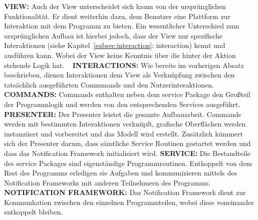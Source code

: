 \newline
\textbf{VIEW:}\newline
Auch der View unterscheidet sich kaum von der ursprünglichen Funktionalität. Er dient weiterhin dazu, dem Benutzer eine Plattform zur Interaktion mit dem Programm zu bieten. Ein wesentlicher Unterschied zum ursprünglichen Aufbau ist hierbei jedoch, dass der View nur spezifische Interaktionen (siehe Kapitel~\ref{subsec:interaction}: interaction) kennt und ausführen kann. Wobei der View keine Kenntnis über die hinter der Aktion stehende Logik hat.
~\newline
\textbf{INTERACTIONS:}\newline
Wie bereits im vorherigen Absatz beschrieben, dienen Interaktionen dem View als Verknüpfung zwischen den tatsächlich ausgeführten Commmands und den Nutzerinteraktionen.\newline
 \newline
\textbf{COMMANDS:}\newline
Commands enthalten neben dem service Package den Großteil der Programmlogik und werden von den entsprechenden Services ausgeführt.\newline
 \newline
\textbf{PRESENTER:}\newline
Der Presenter leistet die gesamte Aufbauarbeit. Commands werden mit bestimmten Interaktionen verknüpft, grafische Oberflächen werden instanziiert und vorbereitet und das Modell wird erstellt.
Zusätzlich kümmert sich der Presenter darum, dass sämtliche Service Routinen gestartet werden und dass das Notification Framework initialisiert wird.\newline
 \newline
\textbf{SERVICE:}\newline
Die Bestandteile des service Packages sind eigenständige Programmroutinen. Entkoppelt von dem Rest des Programms erledigen sie Aufgaben und kommunizieren mittels des Notification Frameworks mit anderen Teilnehmern des Programms.\newline
 \newline
\textbf{NOTIFICATION FRAMEWORK:}\newline
Das Notification Framework dient zur Kommunkation zwischen den einzelnen Programmteilen, wobei diese voneinander entkoppelt bleiben.